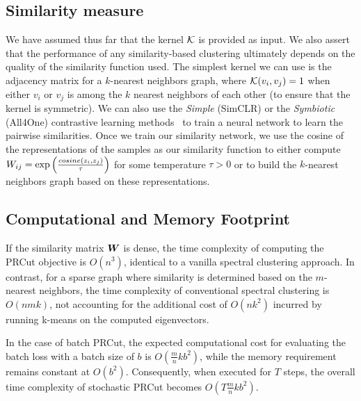 \subsection{Similarity measure}
We have assumed thus far that the kernel ${\mathcal{K}}$ is provided as input. We also assert
that the performance of any similarity-based clustering ultimately depends on the
quality of the similarity function used. The simplest kernel we can use is the
adjacency matrix for a $k$-nearest neighbors graph, where ${\mathcal{K}}(v_i,v_j)=1$ when
either $v_i$ or $v_j$ is among the $k$ nearest neighbors of each other (to ensure
that the kernel is symmetric). We can also use the \textit{Simple} (SimCLR) or the
\textit{Symbiotic} (All4One) contrastive learning methods~\citep{simCLR,all4one} to
train a neural network to learn the pairwise similarities. Once we train our
similarity network, we use the cosine of the representations of the samples as our
similarity function to either compute ${W}_{ij}=\exp\left(\frac{\mathop{cosine}\left(z_i,
z_j\right)}{\tau}\right)$ for some temperature $\tau>0$ or to build the $k$-nearest neighbors
graph based on these representations.

\subsection{Computational and Memory Footprint}
If the similarity matrix ${\bm{W}}$ is dense, the time complexity of computing the PRCut objective is $O(n^3)$, identical to a vanilla spectral clustering approach. In contrast, for a sparse graph where similarity is determined based on the $m$-nearest neighbors, the time complexity of conventional spectral clustering is $O(nmk)$, not accounting for the additional cost of $O(nk^2)$ incurred by running k-means on the computed eigenvectors.

In the case of batch PRCut, the expected computational cost for evaluating the batch loss with a batch size of $b$ is $O\left(\frac{m}{n}kb^2\right)$, while the memory requirement remains constant at $O(b^2)$. Consequently, when executed for $T$ steps, the overall time complexity of stochastic PRCut becomes $O\left(T\frac{m}{n}kb^2\right)$.
%
%
%

